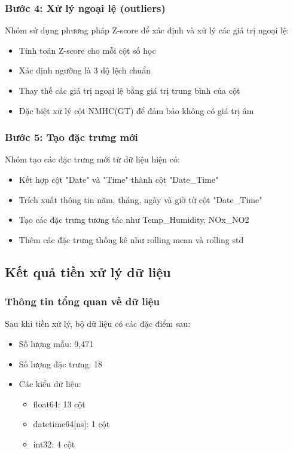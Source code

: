 \subsubsection{Bước 4: Xử lý ngoại lệ (outliers)}
\hspace{0.5cm}Nhóm sử dụng phương pháp Z-score để xác định và xử lý các giá trị ngoại lệ:
\begin{itemize}
    \item Tính toán Z-score cho mỗi cột số học
    \item Xác định ngưỡng là 3 độ lệch chuẩn
    \item Thay thế các giá trị ngoại lệ bằng giá trị trung bình của cột
    \item Đặc biệt xử lý cột NMHC(GT) để đảm bảo không có giá trị âm
\end{itemize}

\subsubsection{Bước 5: Tạo đặc trưng mới}
\hspace{0.5cm}Nhóm tạo các đặc trưng mới từ dữ liệu hiện có:
\begin{itemize}
    \item Kết hợp cột "Date" và "Time" thành cột "Date\_Time"
    \item Trích xuất thông tin năm, tháng, ngày và giờ từ cột "Date\_Time"
    \item Tạo các đặc trưng tương tác như Temp\_Humidity, NOx\_NO2
    \item Thêm các đặc trưng thống kê như rolling mean và rolling std
\end{itemize}

\subsection{Kết quả tiền xử lý dữ liệu}

\subsubsection{Thông tin tổng quan về dữ liệu}
\hspace{0.5cm}Sau khi tiền xử lý, bộ dữ liệu có các đặc điểm sau:
\begin{itemize}
    \item Số lượng mẫu: 9,471
    \item Số lượng đặc trưng: 18
    \item Các kiểu dữ liệu:
    \begin{itemize}
        \item float64: 13 cột
        \item datetime64[ns]: 1 cột
        \item int32: 4 cột
    \end{itemize}
\end{itemize}

